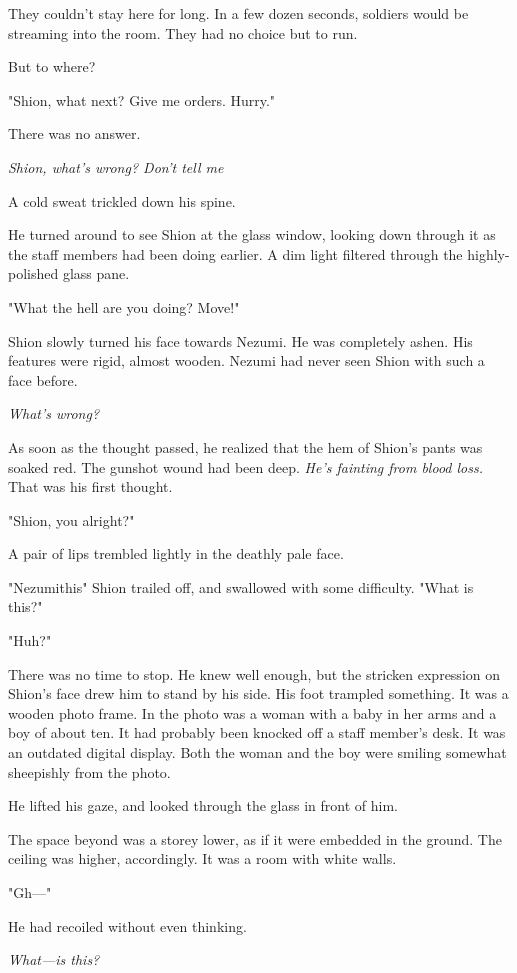 They couldn't stay here for long. In a few dozen seconds, soldiers would
be streaming into the room. They had no choice but to run.

But to where?

"Shion, what next? Give me orders. Hurry."

There was no answer.

\emph{Shion, what's wrong? Don't tell me\el }

A cold sweat trickled down his spine.

He turned around to see Shion at the glass window, looking
down through it as the staff members had been doing earlier. A dim light
filtered through the highly-polished glass pane.

"What the hell are you doing? Move!"

Shion slowly turned his face towards Nezumi. He was completely ashen.
His features were rigid, almost wooden. Nezumi had never seen Shion with
such a face before.

\emph{What's wrong?}

As soon as the thought passed, he realized that the hem of Shion's pants
was soaked red. The gunshot wound had been deep. \emph{He's fainting from
blood loss.} That was his first thought.

"Shion, you alright?"

A pair of lips trembled lightly in the deathly pale face.

"Nezumi\el this\el " Shion trailed off, and swallowed with some
difficulty. "What is this\el ?"

"Huh?"

There was no time to stop. He knew well enough, but the stricken
expression on Shion's face drew him to stand by his side. His foot
trampled something. It was a wooden photo frame. In the photo was a
woman with a baby in her arms and a boy of about ten. It had probably
been knocked off a staff member's desk. It was an outdated digital
display. Both the woman and the boy were smiling somewhat sheepishly
from the photo.

He lifted his gaze, and looked through the glass in front of him.

The space beyond was a storey lower, as if it were embedded in the
ground. The ceiling was higher, accordingly. It was a room with white
walls.

"Gh---"

He had recoiled without even thinking.

\emph{What---is this?}